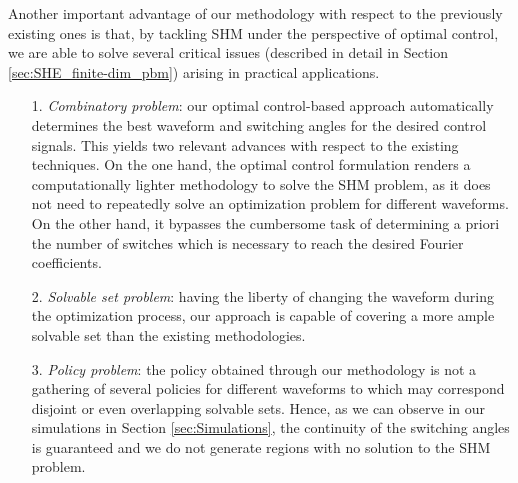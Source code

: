 \documentclass[twocolumn]{autart}    %
\begin{document}
Another important advantage of our methodology with respect to the previously existing ones is that, by tackling SHM under the perspective of optimal control, we are able to solve several critical issues (described in detail in Section \ref{sec:SHE_finite-dim_pbm}) arising in practical applications. 
\begin{itemize}
	\item[1.]  \textit{Combinatory problem}: our optimal control-based approach automatically determines the best waveform and switching angles for the desired control signals. This yields two relevant advances with respect to the existing techniques. On the one hand, the optimal control formulation renders a computationally lighter methodology to solve the SHM problem, as it does not need to repeatedly solve an optimization problem for different waveforms. On the other hand, it bypasses the cumbersome task of determining a priori the number of switches which is necessary to reach the desired Fourier coefficients.
	
	\item[2.] \textit{Solvable set problem}: having the liberty of changing the waveform during the optimization process, our approach is capable of covering a more ample solvable set than the existing methodologies. 
		
	\item[3.] \textit{Policy problem}: the policy obtained through our methodology is not a gathering of several policies for different waveforms to which may correspond disjoint or even overlapping solvable sets. Hence, as we can observe in our simulations in Section \ref{sec:Simulations}, 
	the continuity of the switching angles is guaranteed and we do not generate regions with no solution to the SHM problem.
\end{itemize}

\end{document}
